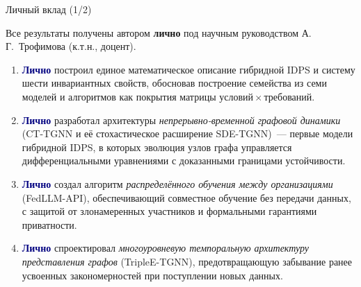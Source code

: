\documentclass[10pt,aspectratio=169]{beamer}
\newcommand{\hl}[1]{\textcolor{accent}{\textbf{#1}}}
\newcommand{\bn}[1]{\textcolor{navy}{\textbf{#1}}}
\begin{document}
\begin{frame}{Личный вклад (1/2)}
\begin{center}
\begin{minipage}{0.92\textwidth}
\small
Все результаты получены автором \hl{лично} под научным
руководством А.\,Г.~Трофимова (к.т.н., доцент).

\smallskip
\begin{enumerate}\setlength\itemsep{4pt}
\item \bn{Лично} построил единое математическое описание
гибридной IDPS и систему шести инвариантных свойств,
обосновав построение семейства из семи моделей и алгоритмов
как покрытия матрицы условий\,$\times$\,требований.

\item \bn{Лично} разработал архитектуры
\emph{непрерывно-временной графовой динамики}
(CT-TGNN и её стохастическое расширение SDE-TGNN)~---
первые модели гибридной IDPS, в которых эволюция узлов
графа управляется дифференциальными уравнениями с
доказанными границами устойчивости.

\item \bn{Лично} создал алгоритм \emph{распределённого
обучения между организациями} (FedLLM-API), обеспечивающий
совместное обучение без передачи данных, с защитой от
злонамеренных участников и формальными гарантиями
приватности.

\item \bn{Лично} спроектировал \emph{многоуровневую
темпоральную архитектуру представления графов}
(TripleE-TGNN), предотвращающую забывание ранее усвоенных
закономерностей при поступлении новых данных.
\end{enumerate}
\end{minipage}
\end{center}
\end{frame}
\end{document}
